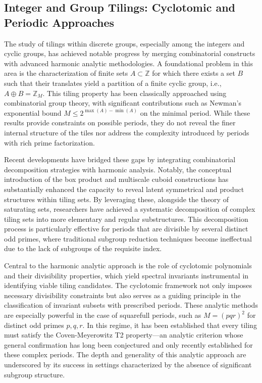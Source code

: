 \documentclass[sigconf]{acmart}
\begin{document}
\subsection{Integer and Group Tilings: Cyclotomic and Periodic Approaches}

The study of tilings within discrete groups, especially among the integers and cyclic groups, has achieved notable progress by merging combinatorial constructs with advanced harmonic analytic methodologies. A foundational problem in this area is the characterization of finite sets \( A \subset \mathbb{Z} \) for which there exists a set \( B \) such that their translates yield a partition of a finite cyclic group, i.e., \( A \oplus B = \mathbb{Z}_M \). This tiling property has been classically approached using combinatorial group theory, with significant contributions such as Newman's exponential bound \( M \leq 2^{\max(A)-\min(A)} \) on the minimal period. While these results provide constraints on possible periods, they do not reveal the finer internal structure of the tiles nor address the complexity introduced by periods with rich prime factorization.

Recent developments have bridged these gaps by integrating combinatorial decomposition strategies with harmonic analysis. Notably, the conceptual introduction of the box product and multiscale cuboid constructions has substantially enhanced the capacity to reveal latent symmetrical and product structures within tiling sets. By leveraging these, alongside the theory of saturating sets, researchers have achieved a systematic decomposition of complex tiling sets into more elementary and regular substructures. This decomposition process is particularly effective for periods that are divisible by several distinct odd primes, where traditional subgroup reduction techniques become ineffectual due to the lack of subgroups of the requisite index.

Central to the harmonic analytic approach is the role of cyclotomic polynomials and their divisibility properties, which yield spectral invariants instrumental in identifying viable tiling candidates. The cyclotomic framework not only imposes necessary divisibility constraints but also serves as a guiding principle in the classification of invariant subsets with prescribed periods. These analytic methods are especially powerful in the case of squarefull periods, such as \( M = (pqr)^2 \) for distinct odd primes \( p, q, r \). In this regime, it has been established that every tiling must satisfy the Coven-Meyerowitz T2 property---an analytic criterion whose general confirmation has long been conjectured and only recently established for these complex periods. The depth and generality of this analytic approach are underscored by its success in settings characterized by the absence of significant subgroup structure.
\end{document}
